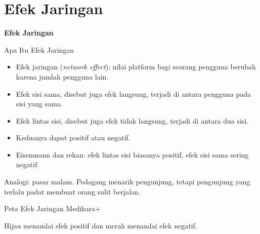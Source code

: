 \documentclass[aspectratio=169, table, 12pt]{beamer}
\begin{document}
\section{Efek Jaringan}

\begin{frame}{\hfill}
  \centering
  \Huge{\textbf{Efek Jaringan}}
\end{frame}

\begin{frame}{{\Large Apa Itu Efek Jaringan}}
  \begin{itemize}
    \item Efek jaringan (\textit{network effect}): nilai platform bagi seorang pengguna berubah karena jumlah pengguna lain.
    \item Efek sisi sama, disebut juga efek langsung, terjadi di antara pengguna pada sisi yang sama.
    \item Efek lintas sisi, disebut juga efek tidak langsung, terjadi di antara dua sisi.
    \item Keduanya dapat positif atau negatif.
    \item Eisenmann dan rekan: efek lintas sisi biasanya positif, efek sisi sama sering negatif.
  \end{itemize}
  \vspace{2pt}
  {\footnotesize Analogi: pasar malam. Pedagang menarik pengunjung, tetapi pengunjung yang terlalu padat membuat orang sulit berjalan.\par}
\end{frame}

\begin{frame}{{\Large Peta Efek Jaringan Medikara+}}
  \centering
  \resizebox{0.92\textwidth}{!}{}

  \vspace{6pt}
  {\footnotesize Hijau menandai efek positif dan merah menandai efek negatif.\par}
\end{frame}
\end{document}
